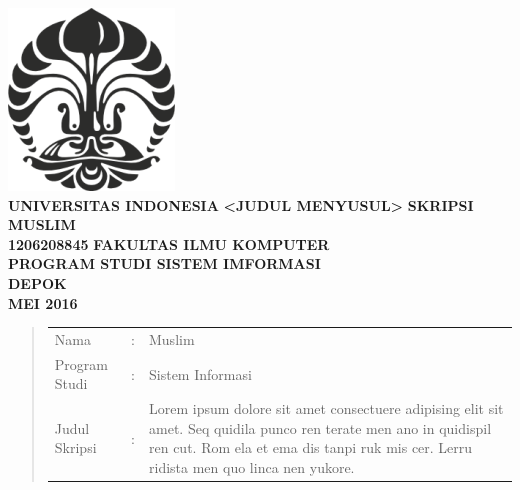 \documentclass[]{article}
\begin{document}
\begin{spacing}{1.5}


\begin{titlepage}
\begin{center}    
\includegraphics{logo_UI_hitam.png}\\
\uppercase{\textbf{universitas indonesia}}
\vfill
\uppercase{\textbf{<judul menyusul>}}
\vfill
\uppercase{\textbf{skripsi}}
\vfill
\uppercase{\textbf{Muslim}}\\
\uppercase{\textbf{1206208845}}
\vfill
\uppercase{\textbf{fakultas ilmu komputer}}\\
\uppercase{\textbf{program studi sistem imformasi}}\\
\uppercase{\textbf{depok}}\\
\uppercase{\textbf{mei 2016}}\\
\end{center}
\end{titlepage}

\renewcommand{\abstractname}{\large Abstrak}
\begin{abstract}
\begin{center}
    \begin{tabular}{l l p{8.78cm}}
        Nama & : & Muslim \\
        Program Studi & : & Sistem Informasi \\
        Judul Skripsi & : & Lorem ipsum dolore sit amet consectuere adipising elit sit amet.
        Seq quidila punco ren terate men ano in quidispil ren cut. 
        Rom ela et ema dis tanpi ruk mis cer.
        Lerru ridista men quo linca nen yukore.
    \end{tabular}
\end{center}
\vspace{2em}
\blindtext
\vfill
\end{abstract}
\newpage

\renewcommand{\contentsname}{Daftar Isi}
\tableofcontents
{}
\lhead{}
\newpage


\end{spacing}
\end{document}
